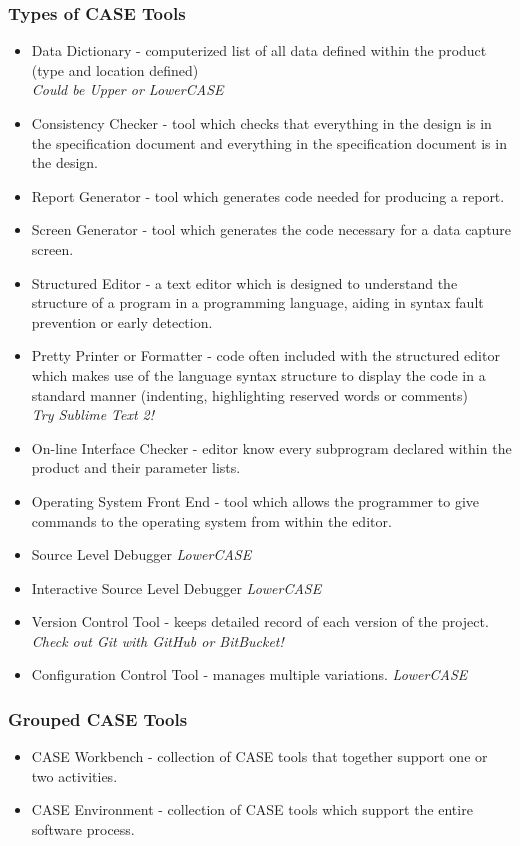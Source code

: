 \documentclass{report}
\begin{document}
				\subsubsection{Types of CASE Tools}
					\begin{itemize}
						\item Data Dictionary - computerized list of all data defined within the product (type and location defined)\\
							\textit{Could be Upper or LowerCASE}
						\item Consistency Checker - tool which checks that everything in the design is in the specification document and everything in the specification document is in the design.
						\item Report Generator - tool which generates code needed for producing a report.
						\item Screen Generator - tool which generates the code necessary for a data capture screen.
						\item Structured Editor - a text editor which is designed to understand the structure of a program in a programming language, aiding in syntax fault prevention or early detection.
						\item Pretty Printer or Formatter - code often included with the structured editor which makes use of the language syntax structure to display the code in a standard manner (indenting, highlighting reserved words or comments)\\
							\textit{Try Sublime Text 2!}
						\item On-line Interface Checker - editor know every subprogram declared within the product and their parameter lists.
						\item Operating System Front End - tool which allows the programmer to give commands to the operating system from within the editor.
						\item Source Level Debugger \textit{LowerCASE}
						\item Interactive Source Level Debugger \textit{LowerCASE}
						\item Version Control Tool - keeps detailed record of each version of the project.\\
							\textit{Check out Git with GitHub or BitBucket!}
						\item Configuration Control Tool - manages multiple variations. \textit{LowerCASE}
					\end{itemize}
				\subsubsection{Grouped CASE Tools}
					\begin{itemize}
						\item CASE Workbench - collection of CASE tools that together support one or two activities.
						\item CASE Environment - collection of CASE tools which support the entire software process.
					\end{itemize}
\end{document}
